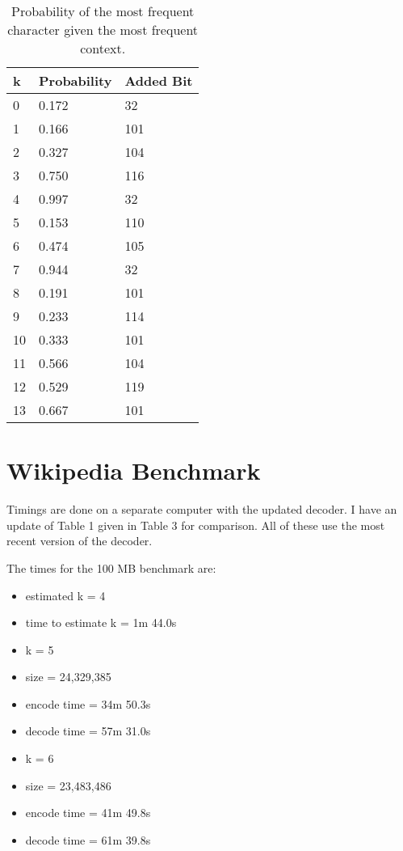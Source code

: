 \documentclass{article}
\begin{document}
\begin{table}[]
\caption{Probability of the most frequent character given the most frequent context.}
\label{probs}
\begin{center}

\begin{tabular}{|l|l|l|}
\hline
k  & Probability & Added Bit \\ \hline
0  & 0.172       & 32        \\ \hline
1  & 0.166       & 101       \\ \hline
2  & 0.327       & 104       \\ \hline
3  & 0.750       & 116       \\ \hline
4  & 0.997       & 32        \\ \hline
5  & 0.153       & 110       \\ \hline
6  & 0.474       & 105       \\ \hline
7  & 0.944       & 32        \\ \hline
8  & 0.191       & 101       \\ \hline
9  & 0.233       & 114       \\ \hline
10 & 0.333       & 101       \\ \hline
11 & 0.566       & 104       \\ \hline
12 & 0.529       & 119       \\ \hline
13 & 0.667       & 101       \\ \hline
\end{tabular}
\end{center}

\end{table}

\section{Wikipedia Benchmark}

Timings are done on a separate computer with the updated decoder. I have an update of Table 1 given in Table 3 for comparison. All of these use the most recent version of the decoder.

The times for the 100 MB benchmark are:

\begin{itemize}
\item estimated k = 4
\item time to estimate k = 1m 44.0s
\item k = 5
\item size = 24,329,385
\item encode time = 34m 50.3s
\item decode time = 57m 31.0s
\item k = 6
\item size = 23,483,486
\item encode time = 41m 49.8s
\item decode time = 61m 39.8s
\end{itemize}
\end{document}

